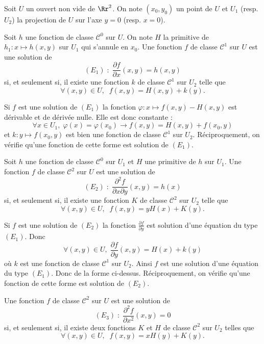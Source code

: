 \documentclass[class=report,crop=false]{standalone}
\begin{document}
\vskip4mm

\noindent Soit $U$ un ouvert non vide de $\Rr^2$. On note $(x_0,y_0)$ un point de $U$ et $U_1$ (resp. $U_2$) la projection de $U$ sur l'axe $y=0$ (resp. $x=0$).

\vskip6mm

\begin{proposition}Soit $h$ une fonction de classe $\mathscr{C}^0$ sur $U$. On note $H$ la primitive de $h_1:x\mapsto h(x,y)$ sur $U_1$ qui s'annule en $x_0$. Une fonction $f$ de classe $\mathscr{C}^1$ sur $U$ est une solution de 
$$(E_1)\; :\; \frac{\partial f}{\partial x}(x,y)=h(x,y)$$
si, et seulement si, il existe une fonction $k$ de classe $\mathscr{C}^1$ sur $U_2$ telle que
$$\forall (x,y)\in U,\; \; f(x,y)=H(x,y)+k(y).$$
\end{proposition}

\vskip4mm

Si $f$ est une solution de $(E_1)$ la fonction $\varphi :x\mapsto f(x,y)-H(x,y)$ est dérivable et de dérivée nulle. Elle est donc constante :
$$\forall x\in U_1,\; \varphi (x)=\varphi (x_0)\rightarrow f(x,y)=H(x,y)+f(x_0,y)$$
et $k:y\mapsto f(x_0,y)$ est bien une fonction de classe $\mathscr{C}^1$ sur $U_2$. Réciproquement, on vérifie qu'une fonction de cette forme est solution de $(E_1)$.

\vskip6mm

\begin{proposition}Soit $h$ une fonction de classe $\mathscr{C}^0$ sur $U_1$ et $H$ une primitive de $h$ sur $U_1$. Une fonction $f$ de classe $\mathscr{C}^2$ sur $U$ est une solution de 
$$(E_2)\; :\; \frac{\partial ^2f}{\partial x\partial y}(x,y)=h(x)$$
si, et seulement si, il existe une fonction $K$ de classe $\mathscr{C}^2$ sur $U_2$ telle que
$$\forall (x,y)\in U,\; \; f(x,y)=yH(x)+K(y).$$
\end{proposition}

\vskip4mm

Si $f$ est une solution de $(E_2)$ la fonction $\displaystyle \frac{\partial f}{\partial y}$ est solution d'une équation du type $(E_1)$. Donc
$$\forall (x,y)\in U,\; \frac{\partial f}{\partial y}(x,y)=H(x)+k(y)$$
o\`u $k$ est une fonction de classe $\mathscr{C}^1$ sur $U_2$. Ainsi $f$ est une solution d'une équation du type $(E_1)$. Donc de la forme ci-dessus.  Réciproquement, on vérifie qu'une fonction de cette forme est solution de $(E_2)$.

\vskip6mm

\begin{proposition}Une fonction $f$ de classe $\mathscr{C}^2$ sur $U$ est une solution de 
$$(E_3)\; :\; \frac{\partial ^2f}{\partial x^2}(x,y)=0$$
si, et seulement si, il existe deux fonctions $K$ et $H$ de classe $\mathscr{C}^2$ sur $U_2$ telles que
$$\forall (x,y)\in U,\; \; f(x,y)=xH(y)+K(y).$$
\end{proposition}
\end{document}

